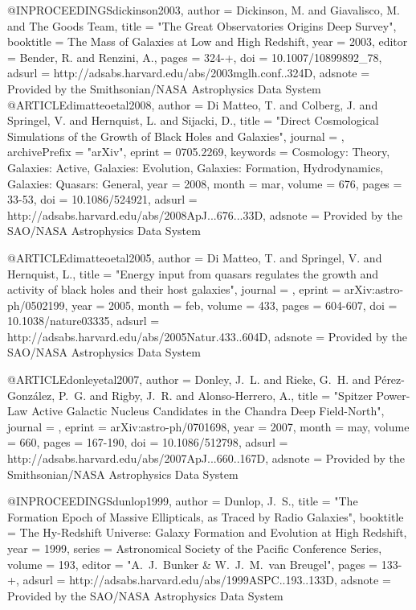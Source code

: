 {{{{{{{{{{{{{{{@INPROCEEDINGS{dickinson2003,
   author = {{Dickinson}, M. and {Giavalisco}, M. and {The Goods Team}},
    title = "{The Great Observatories Origins Deep Survey}",
booktitle = {The Mass of Galaxies at Low and High Redshift},
     year = 2003,
   editor = {{Bender}, R. and {Renzini}, A.},
    pages = {324-+},
      doi = {10.1007/10899892_78},
   adsurl = {http://adsabs.harvard.edu/abs/2003mglh.conf..324D},
  adsnote = {Provided by the Smithsonian/NASA Astrophysics Data System}
}
@ARTICLE{dimatteoetal2008,
   author = {{Di Matteo}, T. and {Colberg}, J. and {Springel}, V. and {Hernquist}, L. and 
	{Sijacki}, D.},
    title = "{Direct Cosmological Simulations of the Growth of Black Holes and Galaxies}",
  journal = {\apj},
archivePrefix = "arXiv",
   eprint = {0705.2269},
 keywords = {Cosmology: Theory, Galaxies: Active, Galaxies: Evolution, Galaxies: Formation, Hydrodynamics, Galaxies: Quasars: General},
     year = 2008,
    month = mar,
   volume = 676,
    pages = {33-53},
      doi = {10.1086/524921},
   adsurl = {http://adsabs.harvard.edu/abs/2008ApJ...676...33D},
  adsnote = {Provided by the SAO/NASA Astrophysics Data System}
}

@ARTICLE{dimatteoetal2005,
   author = {{Di Matteo}, T. and {Springel}, V. and {Hernquist}, L.},
    title = "{Energy input from quasars regulates the growth and activity of black holes and their host galaxies}",
  journal = {\nat},
   eprint = {arXiv:astro-ph/0502199},
     year = 2005,
    month = feb,
   volume = 433,
    pages = {604-607},
      doi = {10.1038/nature03335},
   adsurl = {http://adsabs.harvard.edu/abs/2005Natur.433..604D},
  adsnote = {Provided by the SAO/NASA Astrophysics Data System}
}


@ARTICLE{donleyetal2007,
   author = {{Donley}, J.~L. and {Rieke}, G.~H. and {P{\'e}rez-Gonz{\'a}lez}, P.~G. and 
	{Rigby}, J.~R. and {Alonso-Herrero}, A.},
    title = "{Spitzer Power-Law Active Galactic Nucleus Candidates in the Chandra Deep Field-North}",
  journal = {\apj},
   eprint = {arXiv:astro-ph/0701698},
     year = 2007,
    month = may,
   volume = 660,
    pages = {167-190},
      doi = {10.1086/512798},
   adsurl = {http://adsabs.harvard.edu/abs/2007ApJ...660..167D},
  adsnote = {Provided by the Smithsonian/NASA Astrophysics Data System}
}

@INPROCEEDINGS{dunlop1999,
   author = {{Dunlop}, J.~S.},
    title = "{The Formation Epoch of Massive Ellipticals, as Traced by Radio Galaxies}",
booktitle = {The Hy-Redshift Universe: Galaxy Formation and Evolution at High Redshift},
     year = 1999,
   series = {Astronomical Society of the Pacific Conference Series},
   volume = 193,
   editor = "{A.~J.~Bunker \& W.~J.~M.~van Breugel}",
    pages = {133-+},
   adsurl = {http://adsabs.harvard.edu/abs/1999ASPC..193..133D},
  adsnote = {Provided by the SAO/NASA Astrophysics Data System}
}


}}}}}}}}}}}}}}}
